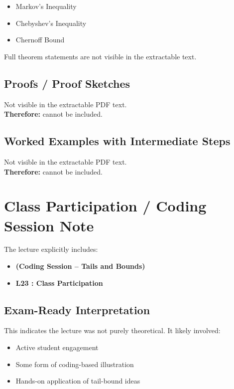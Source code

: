\documentclass[11pt]{article}
\begin{document}
\begin{itemize}
    \item Markov's Inequality
    \item Chebyshev's Inequality
    \item Chernoff Bound
\end{itemize}

Full theorem statements are not visible in the extractable text.

\subsection{Proofs / Proof Sketches}
Not visible in the extractable PDF text. \\
\textbf{Therefore:} cannot be included.

\subsection{Worked Examples with Intermediate Steps}
Not visible in the extractable PDF text. \\
\textbf{Therefore:} cannot be included.

\section{Class Participation / Coding Session Note}

The lecture explicitly includes:

\begin{itemize}
    \item \textbf{(Coding Session -- Tails and Bounds)}
    \item \textbf{L23 : Class Participation}
\end{itemize}

\subsection*{Exam-Ready Interpretation}

This indicates the lecture was not purely theoretical. It likely involved:

\begin{itemize}
    \item Active student engagement
    \item Some form of coding-based illustration
    \item Hands-on application of tail-bound ideas
\end{itemize}
\end{document}
